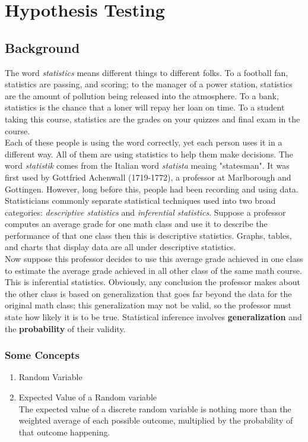 \documentclass[aima331_lecturenotes_ku.tex]{subfiles}
\begin{document}
\chapter{Hypothesis Testing}
\section{Background}
The word \textit{statistics} means different things to different folks. To a football fan, statistics are passing, and scoring; to the manager of a power station, statistics are the amount of pollution being released into the atmosphere. To a bank, statistics is the chance that a loner will repay her loan on time. To a student taking this course, statistics are the grades on your quizzes and final exam in the course. \\[2mm]
Each of these people is using the word correctly, yet each person uses it in a different way. All of them are using statistics to help them make decisions. The word \textit{statistik} comes from the Italian word \textit{statista} meaing "statesman". It was first used by Gottfried Achenwall (1719-1772), a professor at Marlborough and Gottingen. However, long before this, people had been recording and using data. Statisticians commonly separate statistical techniques used into two broad categories: \textit{descriptive statistics} and \textit{inferential statistics}. Suppose a professor computes an average grade for one math class and use it to describe the performance of that one class then this is descriptive statistics. Graphs, tables, and charts that display data are all under descriptive statistics. \\[2mm]
Now suppose this professor decides to use this average grade achieved in one class to estimate the average grade achieved in all other class of the same math course. This is inferential statistics. Obviously, any conclusion the professor makes about the other class is based on generalization that goes far beyond the data for the original math class; this generalization may not be valid, so the professor must state how likely it is to be true. Statistical inference involves \textbf{generalization} and the \textbf{probability} of their validity.

\subsection{Some Concepts}
\begin{enumerate}
\item Random Variable
\item Expected Value of a Random variable \\[1mm]
  The expected value of a discrete random variable is nothing more than the weighted average of each possible outcome, multiplied by the probability of that outcome happening.
\end{enumerate}
\end{document}
